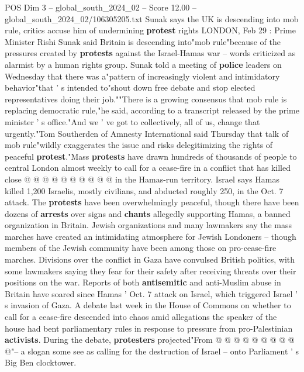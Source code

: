 \begin{textsample}{POS Dim 3 – global\_south\_2024\_02 – Score 12.00 – global\_south\_2024\_02/106305205.txt}  \label{ex:f3_pos_359}
Sunak says the UK is descending into mob rule, critics accuse him of undermining \textbf{protest} rights LONDON, Feb 29 : Prime Minister Rishi Sunak said Britain is descending into"mob rule"because of the pressures created by \textbf{protests} against the Israel-Hamas war -- words criticized as alarmist by a human rights group.
Sunak told a meeting of \textbf{police} leaders on Wednesday that there was a"pattern of increasingly violent and intimidatory behavior"that ' s intended to"shout down free debate and stop elected representatives doing their job.""There is a growing consensus that mob rule is replacing democratic rule,"he said, according to a transcript released by the prime minister ' s office."And we ' ve got to collectively, all of us, change that urgently."Tom Southerden of Amnesty International said Thursday that talk of mob rule"wildly exaggerates the issue and risks delegitimizing the rights of peaceful \textbf{protest}."Mass \textbf{protests} have drawn hundreds of thousands of people to central London almost weekly to call for a cease-fire in a conflict that has killed close @ @ @ @ @ @ @ @ @ @ in the Hamas-run territory.
Israel says Hamas killed 1,200 Israelis, mostly civilians, and abducted roughly 250, in the Oct. 7 attack.
The \textbf{protests} have been overwhelmingly peaceful, though there have been dozens of \textbf{arrests} over signs and \textbf{chants} allegedly supporting Hamas, a banned organization in Britain.
Jewish organizations and many lawmakers say the mass marches have created an intimidating atmosphere for Jewish Londoners -- though members of the Jewish community have been among those on pro-cease-fire marches.
Divisions over the conflict in Gaza have convulsed British politics, with some lawmakers saying they fear for their safety after receiving threats over their positions on the war.
Reports of both \textbf{antisemitic} and anti-Muslim abuse in Britain have soared since Hamas ' Oct. 7 attack on Israel, which triggered Israel ' s invasion of Gaza.
A debate last week in the House of Commons on whether to call for a cease-fire descended into chaos amid allegations the speaker of the house had bent parliamentary rules in response to pressure from pro-Palestinian \textbf{activists}.
During the debate, \textbf{protesters} projected"From @ @ @ @ @ @ @ @ @ @"-- a slogan some see as calling for the destruction of Israel -- onto Parliament ' s Big Ben clocktower.

\end{textsample}
